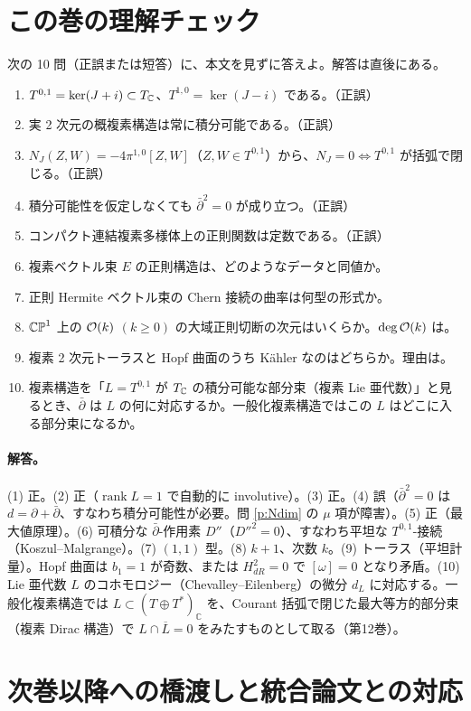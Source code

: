 \section{この巻の理解チェック}\label{sec:check}
次の 10 問（正誤または短答）に、本文を見ずに答えよ。解答は直後にある。
\begin{enumerate}
\item $T^{0,1}=\ker(J+i)\subset T_{\mathbb C}$、$T^{1,0}=\ker(J-i)$ である。（正誤）
\item 実 2 次元の概複素構造は常に積分可能である。（正誤）
\item $N_J(Z,W)=-4\pi^{1,0}[Z,W]$（$Z,W\in T^{0,1}$）から、$N_J=0\iff T^{0,1}$ が括弧で閉じる。（正誤）
\item 積分可能性を仮定しなくても $\bar\partial^2=0$ が成り立つ。（正誤）
\item コンパクト連結複素多様体上の正則関数は定数である。（正誤）
\item 複素ベクトル束 $E$ の正則構造は、どのようなデータと同値か。
\item 正則 Hermite ベクトル束の Chern 接続の曲率は何型の形式か。
\item $\mathbb{CP}^1$ 上の $\mathcal O(k)$ $(k\ge0)$ の大域正則切断の次元はいくらか。$\deg\mathcal O(k)$ は。
\item 複素 2 次元トーラスと Hopf 曲面のうち Kähler なのはどちらか。理由は。
\item 複素構造を「$L=T^{0,1}$ が $T_{\mathbb C}$ の積分可能な部分束（複素 Lie 亜代数）」と見るとき、$\bar\partial$ は $L$ の何に対応するか。一般化複素構造ではこの $L$ はどこに入る部分束になるか。
\end{enumerate}
\paragraph{解答。}
(1) 正。(2) 正（$\operatorname{rank}L=1$ で自動的に involutive）。(3) 正。(4) 誤（$\bar\partial^2=0$ は $d=\partial+\bar\partial$、すなわち積分可能性が必要。問 \ref{p:Ndim} の $\mu$ 項が障害）。(5) 正（最大値原理）。(6) 可積分な $\bar\partial$-作用素 $D''$（$D''^2=0$）、すなわち平坦な $T^{0,1}$-接続（Koszul--Malgrange）。(7) $(1,1)$ 型。(8) $k+1$、次数 $k$。(9) トーラス（平坦計量）。Hopf 曲面は $b_1=1$ が奇数、または $H^2_{dR}=0$ で $[\omega]=0$ となり矛盾。(10) Lie 亜代数 $L$ のコホモロジー（Chevalley--Eilenberg）の微分 $d_L$ に対応する。一般化複素構造では $L\subset(T\oplus T^*)_{\mathbb C}$ を、Courant 括弧で閉じた最大等方的部分束（複素 Dirac 構造）で $L\cap\overline L=0$ をみたすものとして取る（第12巻）。

\section{次巻以降への橋渡しと統合論文との対応}\label{sec:bridge}

